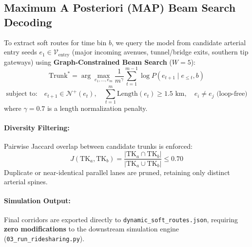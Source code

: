 \documentclass[11pt,a4paper]{article}
\begin{document}
\subsection{Maximum A Posteriori (MAP) Beam Search Decoding}
To extract soft routes for time bin $b$, we query the model from candidate arterial entry seeds $e_1 \in \mathcal{V}_{\text{entry}}$ (major incoming avenues, tunnel/bridge exits, southern tip gateways) using \textbf{Graph-Constrained Beam Search} ($W = 5$):
\begin{equation}
\text{Trunk}^* = \arg\max_{e_1, \dots, e_m} \frac{1}{m^\gamma} \sum_{t=1}^{m-1} \log P(e_{t+1} \mid e_{\le t}, b)
\end{equation}
\begin{equation*}
\text{subject to:} \quad e_{t+1} \in \mathcal{N}^+(e_t), \quad \sum_{t=1}^m \text{Length}(e_t) \ge 1.5\text{ km}, \quad e_i \ne e_j \text{ (loop-free)}
\end{equation*}
where $\gamma = 0.7$ is a length normalization penalty.

\paragraph{Diversity Filtering:} Pairwise Jaccard overlap between candidate trunks is enforced:
\begin{equation}
J(\text{TK}_a, \text{TK}_b) = \frac{|\text{TK}_a \cap \text{TK}_b|}{|\text{TK}_a \cup \text{TK}_b|} \le 0.70
\end{equation}
Duplicate or near-identical parallel lanes are pruned, retaining only distinct arterial spines.

\paragraph{Simulation Output:} Final corridors are exported directly to \texttt{dynamic\_soft\_routes.json}, requiring \textbf{zero modifications} to the downstream simulation engine (\texttt{03\_run\_ridesharing.py}).
\end{document}
